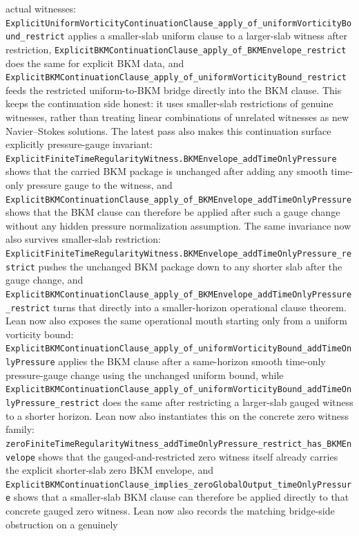\documentclass[11pt]{article}
\begin{document}
actual witnesses:
\texttt{ExplicitUniformVorticityContinuationClause\_apply\_of\_uniformVorticityBound\_restrict}
applies a smaller-slab uniform clause to a larger-slab witness after
restriction,
\texttt{ExplicitBKMContinuationClause\_apply\_of\_BKMEnvelope\_restrict} does
the same for explicit BKM data, and
\texttt{ExplicitBKMContinuationClause\_apply\_of\_uniformVorticityBound\_restrict}
feeds the restricted uniform-to-BKM bridge directly into the BKM clause.  This
keeps the continuation side honest: it uses smaller-slab restrictions of
genuine witnesses, rather than treating linear combinations of unrelated
witnesses as new Navier--Stokes solutions.  The latest pass also makes this
continuation surface explicitly pressure-gauge invariant:
\texttt{ExplicitFiniteTimeRegularityWitness.BKMEnvelope\_addTimeOnlyPressure}
shows that the carried BKM package is unchanged after adding any smooth
time-only pressure gauge to the witness, and
\texttt{ExplicitBKMContinuationClause\_apply\_of\_BKMEnvelope\_addTimeOnlyPressure}
shows that the BKM clause can therefore be applied after such a gauge change
without any hidden pressure normalization assumption.  The same invariance now
also survives smaller-slab restriction:
\texttt{ExplicitFiniteTimeRegularityWitness.BKMEnvelope\_addTimeOnlyPressure\_restrict}
pushes the unchanged BKM package down to any shorter slab after the gauge
change, and
\texttt{ExplicitBKMContinuationClause\_apply\_of\_BKMEnvelope\_addTimeOnlyPressure\_restrict}
turns that directly into a smaller-horizon operational clause theorem.  Lean
now also exposes the same operational mouth starting only from a uniform
vorticity bound:
\texttt{ExplicitBKMContinuationClause\_apply\_of\_uniformVorticityBound\_addTimeOnlyPressure}
applies the BKM clause after a same-horizon smooth time-only pressure-gauge
change using the unchanged uniform bound, while
\texttt{ExplicitBKMContinuationClause\_apply\_of\_uniformVorticityBound\_addTimeOnlyPressure\_restrict}
does the same after restricting a larger-slab gauged witness to a shorter
horizon.  Lean
now also instantiates this on the concrete zero witness family:
\texttt{zeroFiniteTimeRegularityWitness\_addTimeOnlyPressure\_restrict\_has\_BKMEnvelope}
shows that the gauged-and-restricted zero witness itself already carries the
explicit shorter-slab zero BKM envelope, and
\texttt{ExplicitBKMContinuationClause\_implies\_zeroGlobalOutput\_timeOnlyPressure}
shows that a smaller-slab BKM clause can therefore be applied directly to that
concrete gauged zero witness.
Lean now also records the matching bridge-side obstruction on a genuinely
\end{document}
